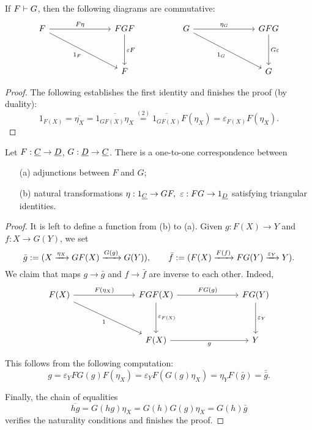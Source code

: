 \begin{lemma*}
	If \( F \mathrel{\vdash} G \), then the following diagrams are commutative:
	\[
		\begin{tikzcd}
			F &&& FGF && G &&& GFG \\
			\\
			&&& F &&&&& G
			\arrow["{F\eta}", from=1-1, to=1-4]
			\arrow["{1_F}"', from=1-1, to=3-4]
			\arrow["{\varepsilon F}", from=1-4, to=3-4]
			\arrow["{\eta_G}", from=1-6, to=1-9]
			\arrow["{1_G}"', from=1-6, to=3-9]
			\arrow["{G\varepsilon}", from=1-9, to=3-9]
		\end{tikzcd}
	\]
\end{lemma*}
\begin{proof}
	The following establishes the first identity and finishes the proof (by duality):
	\[
		1_{F(X)} = \overline{\eta_X} = \overline{1_{GF(X)} \eta_X} \overset{(2)}{=} \overline{1_{GF(X)}} F(\eta_X) = \varepsilon_{F(X)} F(\eta_X).
	\]
\end{proof}

\begin{theorem*}
	Let \( F: \underline{C} \to \underline{D} \), \( G: \underline{D} \to \underline{C} \). There is a one-to-one correspondence between
	\begin{itemize}
		\item[(a)] adjunctions between \( F \) and \( G \);
		\item[(b)] natural transformations \( \eta: 1_{\underline{C}} \to GF,~ \varepsilon: FG \to 1_{\underline{D}} \) satisfying triangular identities.
	\end{itemize}
\end{theorem*}
\begin{proof}
	It is left to define a function from (b) to (a). Given \( g: F(X) \to Y \) and \( f: X \to G(Y) \), we set
	\[
		\bar{g} := (X \xrightarrow{\eta_X} GF(X) \xrightarrow{G(g)} G(Y)),
		\qquad
		\bar{f} := (F(X) \xrightarrow{F(f)} FG(Y) \xrightarrow{\varepsilon_Y} Y).
	\]
	We claim that maps \( g \to \bar{g} \) and \( f \to \bar{f} \) are inverse to each other. Indeed,
	\[
		\begin{tikzcd}{F(X)} &&& {FGF(X)} &&& {FG(Y)} \\
			\\
			&&& {F(X)} &&& Y
			\arrow["{F(\eta_X)}", from=1-1, to=1-4]
			\arrow["1"', from=1-1, to=3-4]
			\arrow["{FG(g)}", from=1-4, to=1-7]
			\arrow["{\varepsilon_{F(X)}}", from=1-4, to=3-4]
			\arrow["{\varepsilon_Y}", from=1-7, to=3-7]
			\arrow["g"', from=3-4, to=3-7]
		\end{tikzcd}
	\]

	This follows from the following computation:
	\[
		g = \varepsilon_Y FG(g) F(\eta_X) = \varepsilon_Y F(G(g) \eta_X) = \eta_Y F(\bar{g}) = \bar{\bar{g}}.
	\]

	Finally, the chain of equalities
	\[
		\overline{hg} = G(hg) \eta_X = G(h) G(g) \eta_X = G(h) \bar{g}
	\]
	verifies the naturality conditions and finishes the proof.
\end{proof}

